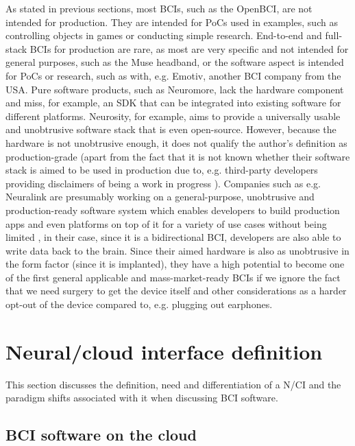 As stated in previous sections, most BCIs, such as the OpenBCI, are not intended for production. They are intended for PoCs used in examples, such as controlling objects in games or conducting simple research. End-to-end and full-stack BCIs for production are rare, as most are very specific and not intended for general purposes, such as the Muse headband, or the software aspect is intended for PoCs or research, such as with, e.g. Emotiv, another BCI company from the USA. Pure software products, such as Neuromore, lack the hardware component and miss, for example, an SDK that can be integrated into existing software for different platforms. Neurosity, for example, aims to provide a universally usable and unobtrusive software stack that is even open-source. However, because the hardware is not unobtrusive enough, it does not qualify the author's definition as production-grade (apart from the fact that it is not known whether their software stack is aimed to be used in production \citep{neurosity_neurosity_2022} due to, e.g. third-party developers providing disclaimers of being a work in progress \citep{turney_notion_2022}). Companies such as e.g. Neuralink are presumably working on a general-purpose, unobtrusive and production-ready software system which enables developers to build production apps and even platforms on top of it for a variety of use cases without being limited \citep{musk_integrated_2019}, in their case, since it is a bidirectional BCI, developers are also able to write data back to the brain. Since their aimed hardware is also as unobtrusive in the form factor (since it is implanted), they have a high potential to become one of the first general applicable and mass-market-ready BCIs if we ignore the fact that we need surgery to get the device itself \citep{neuralink_approach_nodate} and other considerations as a harder opt-out of the device compared to, e.g. plugging out earphones.

\section{Neural/cloud interface definition}
\label{chapter2-neural-cloud-interface-definition}

This section discusses the definition, need and differentiation of a N/CI and the paradigm shifts associated with it when discussing BCI software.

\subsection{BCI software on the cloud}
\label{chapter2-bci-software-on-the-cloud}

